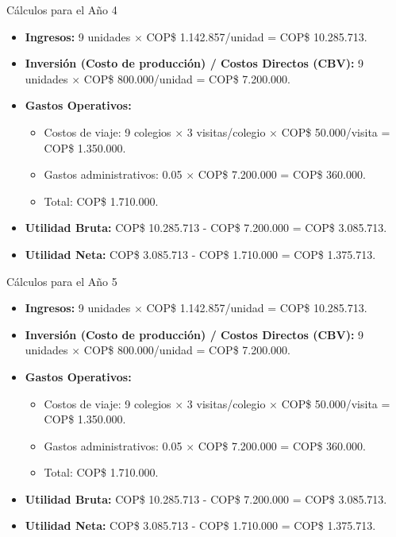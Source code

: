 \begin{frame}{Cálculos para el Año 4}
  \begin{itemize}
    \item \textbf{Ingresos:} 9 unidades $\times$ COP\$ 1.142.857/unidad =
      COP\$ 10.285.713.
    \item \textbf{Inversión (Costo de producción) / Costos Directos (CBV):}
      9 unidades $\times$ COP\$ 800.000/unidad = COP\$ 7.200.000.
    \item \textbf{Gastos Operativos:}
      \begin{itemize}
        \item Costos de viaje: 9 colegios $\times$ 3 visitas/colegio
          $\times$ COP\$ 50.000/visita = COP\$ 1.350.000.
        \item Gastos administrativos: 0.05 $\times$ COP\$ 7.200.000 =
          COP\$ 360.000.
        \item Total: COP\$ 1.710.000.
      \end{itemize}
    \item \textbf{Utilidad Bruta:} COP\$ 10.285.713 - COP\$ 7.200.000 = COP\$ 3.085.713.
    \item \textbf{Utilidad Neta:} COP\$ 3.085.713 - COP\$ 1.710.000 = COP\$ 1.375.713.
  \end{itemize}
\end{frame}

\begin{frame}{Cálculos para el Año 5}
  \begin{itemize}
    \item \textbf{Ingresos:} 9 unidades $\times$ COP\$ 1.142.857/unidad =
      COP\$ 10.285.713.
    \item \textbf{Inversión (Costo de producción) / Costos Directos (CBV):}
      9 unidades $\times$ COP\$ 800.000/unidad = COP\$ 7.200.000.
    \item \textbf{Gastos Operativos:}
      \begin{itemize}
        \item Costos de viaje: 9 colegios $\times$ 3 visitas/colegio
          $\times$ COP\$ 50.000/visita = COP\$ 1.350.000.
        \item Gastos administrativos: 0.05 $\times$ COP\$ 7.200.000 =
          COP\$ 360.000.
        \item Total: COP\$ 1.710.000.
      \end{itemize}
    \item \textbf{Utilidad Bruta:} COP\$ 10.285.713 - COP\$ 7.200.000 = COP\$ 3.085.713.
    \item \textbf{Utilidad Neta:} COP\$ 3.085.713 - COP\$ 1.710.000 = COP\$ 1.375.713.
  \end{itemize}
\end{frame}

